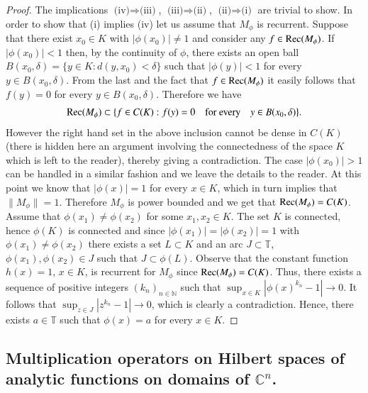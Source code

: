 \documentclass[12pt,leqno]{amsart}
\theoremstyle{plain}
\theoremstyle{definition}
\numberwithin{equation}{section}
\begin{document}
\begin{proof}
	The implications $\text{(iv)}\Rightarrow \text{(iii)}$, $\text{(iii)}\Rightarrow \text{(ii)}$, $\text{(ii)}\Rightarrow \text{(i)}$ are trivial to show. In order to show that (i) implies (iv) let us assume that $M_\phi$ is recurrent. Suppose that there exist $x_0\in K$ with $|\phi (x_0)|\neq 1$ and consider any $f\in {\textnormal{Rec}}(M_\phi )$. If $|\phi (x_0)|<1$ then, by the continuity of $\phi$, there exists an open ball $B(x_0,\delta )=\{ y\in K: d(y,x_0)<\delta \}$ such that $|\phi (y)|<1$ for every $y\in B(x_0,\delta )$. From the last and the fact that $f\in {\textnormal{Rec}}(M_\phi )$ it easily follows that $f(y)=0$ for every $y\in B(x_0,\delta )$. Therefore we have 
	\begin{align*}
		{\textnormal{Rec}}(M_\phi )\subset \{ f\in C(K): f(y)=0 \quad\text{for every}\quad y\in B(x_0,\delta ) \} . 
	\end{align*}
	However the right hand set in the above inclusion cannot be dense in $C(K)$ (there is hidden here an argument involving the connectedness of the space $K$ which is left to the reader), thereby giving a contradiction. The case $|\phi (x_0)|>1$ can be handled in a similar fashion and we leave the details to the reader. At this point we know that $|\phi (x)|=1$ for every $x\in K$, which in turn implies that $\| M_\phi \| =1$. Therefore $M_\phi $ is power bounded and we get that ${\textnormal{Rec}}(M_\phi )=C(K)$. Assume that $\phi (x_1)\neq \phi (x_2)$ for some $x_1,x_2\in K$. The set $K$ is connected, hence $\phi (K)$ is connected and since $|\phi (x_1)|=|\phi (x_2) |=1$ with $\phi (x_1)\neq \phi (x_2)$ there exists a set $L\subset K$ and an arc $J\subset \mathbb{T}$, $\phi (x_1),\phi (x_2)\in J$ such that $J\subset \phi (L)$. Observe that the constant function $h(x)=1$, $x\in K$, is recurrent for $M_\phi$ since ${\textnormal{Rec}}(M_\phi )=C(K)$. Thus, there exists a sequence of positive integers $(k_n)_{n\in\mathbb N}$ such that $\sup_{x\in K}|{\phi (x)}^{k_n}-1|\to 0$. It follows that $\sup_{z\in J}|z^{k_n}-1|\to 0$, which is clearly a contradiction. Hence, there exists $a\in \mathbb T$ such that $\phi (x)=a$ for every $x\in K$. 
\end{proof}

\subsection{Multiplication operators on Hilbert spaces of analytic functions on domains of \texorpdfstring{${\mathbb C}^n $}{Cn}.}
\end{document}
